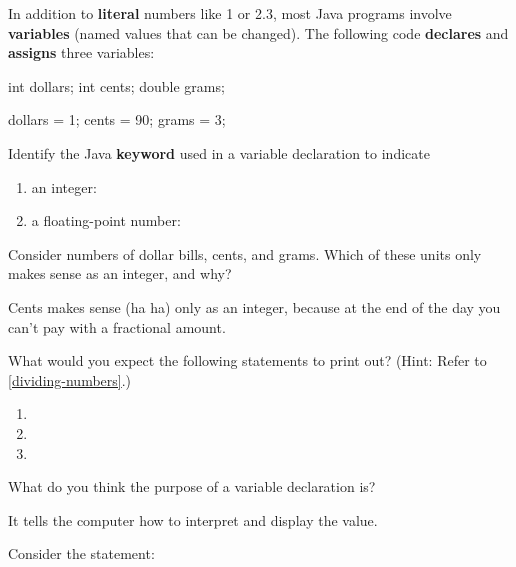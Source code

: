 
\label{variable-declare}

In addition to \textbf{literal} numbers like 1 or 2.3, most Java programs involve \textbf{variables} (named values that can be changed).
The following code \textbf{declares} and \textbf{assigns} three variables:

\begin{javabox}
int dollars;
int cents;
double grams;

dollars = 1;
cents = 90;
grams = 3;
\end{javabox}




\Q Identify the Java \textbf{keyword} used in a variable declaration to indicate

\begin{enumerate}
\item an integer: 
\item a floating-point number: 
\end{enumerate}


\Q Consider numbers of dollar bills, cents, and grams. Which of these units only makes sense as an integer, and why?

\begin{answer}
Cents makes sense (ha ha) only as an integer, because at the end of the day you can't pay with a fractional amount.
\end{answer}


\Q What would you expect the following statements to print out? (Hint: Refer to \ref{dividing-numbers}.)

\begin{enumerate}
\item {} 
\item {} 
\item {} 
\end{enumerate}


\Q What do you think the purpose of a variable declaration is?

\begin{answer}
It tells the computer how to interpret and display the value.
\end{answer}


\newpage
\Q Consider the statement: ~ 

